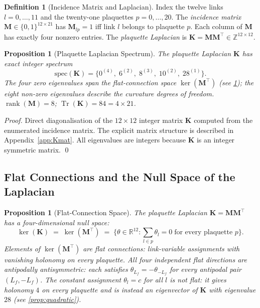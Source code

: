 \documentclass[12pt, a4paper]{article}
\theoremstyle{plain}
\newtheorem{proposition}[theorem]{Proposition}
\theoremstyle{definition}
\newtheorem{definition}[theorem]{Definition}
\theoremstyle{remark}
\newcommand{\Kmat}{\mathbf{K}}
\newcommand{\Mmat}{\mathbf{M}}
\newcommand{\R}{\mathbb{R}}
\newcommand{\Z}{\mathbb{Z}}
\newcommand{\Tr}{\operatorname{Tr}}
\newcommand{\rank}{\operatorname{rank}}
\begin{document}
\begin{definition}[Incidence Matrix and Laplacian]\label{def:laplacian}
Index the twelve links $l=0,\ldots,11$ and the twenty-one
plaquettes $p=0,\ldots,20$.
The \emph{incidence matrix} $\Mmat\in\{0,1\}^{12\times21}$
has $\Mmat_{lp}=1$ iff link $l$ belongs to plaquette $p$.
Each column of $\Mmat$ has exactly four nonzero entries.
The \emph{plaquette Laplacian} is
$\Kmat = \Mmat\Mmat^\top \in\Z^{12\times12}$.
\end{definition}

\begin{proposition}[Plaquette Laplacian Spectrum]\label{prop:spectrum}
The plaquette Laplacian $\Kmat$ has exact integer spectrum
\[
  \mathrm{spec}(\Kmat)
  = \bigl\{0^{(4)},\; 6^{(2)},\; 8^{(3)},\;
            10^{(2)},\; 28^{(1)}\bigr\}.
\]
The four zero eigenvalues span the flat-connection space
$\ker(\Mmat^\top)$ (see \cref{prop:flat});
the eight non-zero eigenvalues describe the curvature degrees
of freedom.
$\rank(\Mmat)=8$; $\Tr(\Kmat)=84=4\times21$.
\end{proposition}

\begin{proof}
Direct diagonalisation of the $12\times12$ integer matrix $\Kmat$
computed from the enumerated incidence matrix.
The explicit matrix structure is described in
Appendix~\ref{app:Kmat}.
All eigenvalues are integers because $\Kmat$ is an integer
symmetric matrix.
\qed
\end{proof}

\subsection{Flat Connections and the Null Space of the Laplacian}
 
\begin{proposition}[Flat-Connection Space]\label{prop:flat}
The plaquette Laplacian $\Kmat = \Mmat\Mmat^\top$ has a
four-dimensional null space:
\[
  \ker(\Kmat) \;=\; \ker(\Mmat^\top)
  \;=\; \bigl\{\theta\in\R^{12} :
  \textstyle\sum_{l\in p}\theta_l = 0
  \;\text{for every plaquette } p\bigr\}.
\]
Elements of $\ker(\Mmat^\top)$ are \emph{flat connections}:
link-variable assignments with vanishing holonomy on every
plaquette.
All four independent flat directions are antipodally antisymmetric:
each satisfies $\theta_{L_f} = -\theta_{-L_f}$ for every antipodal
pair $(L_f, -L_f)$.
The constant assignment $\theta_l = c$ for all $l$ is \emph{not} flat:
it gives holonomy $4$ on every plaquette and is instead an eigenvector
of $\Kmat$ with eigenvalue $28$ (see \cref{prop:quadratic}).
\end{proposition}
 
\end{document}
